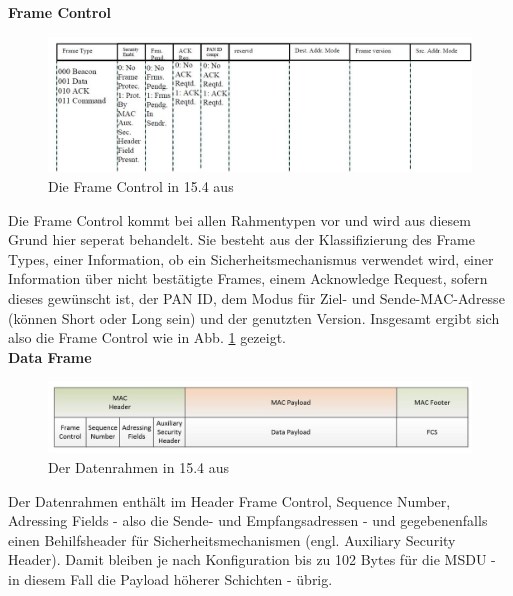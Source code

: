 \textbf{Frame Control} \\
\begin{figure}
	\centering
	\includegraphics[width=\textwidth]{Grafiken-Alex/framecontrol.jpg}
	\caption{Die Frame Control in 15.4 aus \cite{rubinstein}}
	\label{framecontrol}
\end{figure}

Die Frame Control kommt bei allen Rahmentypen vor und wird aus diesem Grund hier seperat behandelt. Sie besteht aus der Klassifizierung des Frame Types, einer Information, ob ein Sicherheitsmechanismus verwendet wird, einer Information über nicht bestätigte Frames, einem Acknowledge Request, sofern dieses gewünscht ist, der PAN ID, dem Modus für Ziel- und Sende-MAC-Adresse (können Short oder Long sein) und der genutzten Version. Insgesamt ergibt sich also die Frame Control wie in Abb. \ref{framecontrol} gezeigt. \\

\textbf{Data Frame} \\
\begin{figure}
	\centering
	\includegraphics[width=\textwidth]{Grafiken-Alex/dataframe.jpg}
	\caption{Der Datenrahmen in 15.4 aus \cite{bartusch}}
	\label{dataframe}
\end{figure}
Der Datenrahmen enthält im Header Frame Control, Sequence Number, Adressing Fields - also die Sende- und Empfangsadressen - und gegebenenfalls einen Behilfsheader für Sicherheitsmechanismen (engl. Auxiliary Security Header). Damit bleiben je nach Konfiguration bis zu 102 Bytes für die MSDU - in diesem Fall die Payload höherer Schichten - übrig. \\

